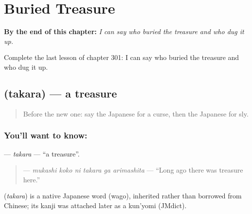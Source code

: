 
\chapter{Buried Treasure}
\label{ch:ja-buried-treasure}

\begin{chapteropening}
\textbf{By the end of this chapter:} \emph{I can say who buried the treasure and who dug it up.}

Complete the last lesson of chapter 301: I can say who buried the treasure and who dug it up.
\end{chapteropening}

\section[\texorpdfstring{\ja{たから} (takara)}{たから (takara)}]{ (takara) — a treasure}

\label{lesson:JA-C301-takara}



\begin{quote}
Before the new one: say the Japanese for a curse, then the Japanese for sly.
\end{quote}

\subsection*{You'll want to know: }
\textbf{} — \emph{takara} — \textquotedblleft{}a treasure\textquotedblright{}.

\begin{quote}
\textbf{   } — \emph{mukashi koko ni takara ga arimashita} — \textquotedblleft{}Long ago there was treasure here.\textquotedblright{}
\end{quote}

\begin{cousinweb}
\textbf{} (\emph{takara}) is a native Japanese word (wago), inherited rather than borrowed from Chinese; its kanji was attached later as a kun'yomi (JMdict).
\end{cousinweb}

